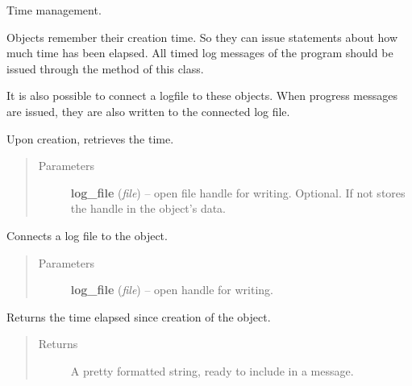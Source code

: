 \documentclass[letterpaper,10pt,english]{sphinxmanual}
\begin{document}

\begin{fulllineitems}
\label{graf/graf:graf.Timestamp}
Time management.

Objects remember their creation time. So they can issue statements about how much time has been elapsed.
All timed log messages of the program should be issued through the {\hyperref[graf/graf:graf.Timestamp.progress]{}} method of this class.

It is also possible to connect a logfile to these objects.
When progress messages are issued, they are also written to the connected log file.

Upon creation, retrieves the time.
\begin{quote}\begin{description}
\item[{Parameters}] \leavevmode
\textbf{log\_file} (\emph{file}) --
open file handle for writing. Optional. If not  stores the handle in the object's data.

\end{description}\end{quote}

\begin{fulllineitems}
\label{graf/graf:graf.Timestamp.connect_log}
Connects a log file to the object.
\begin{quote}\begin{description}
\item[{Parameters}] \leavevmode
\textbf{log\_file} (\emph{file}) --
open handle for writing.

\end{description}\end{quote}

\end{fulllineitems}


\begin{fulllineitems}
\label{graf/graf:graf.Timestamp.elapsed}
Returns the time elapsed since creation of the {\hyperref[graf/graf:graf.Timestamp]{}} object.
\begin{quote}\begin{description}
\item[{Returns}] \leavevmode
A pretty formatted string, ready to include in a message.


\end{description}
\end{quote}
\end{fulllineitems}
\end{fulllineitems}
\end{document}
